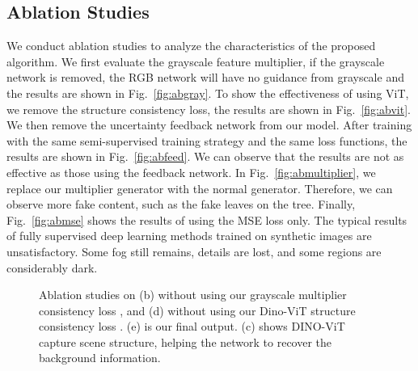 \documentclass[runningheads]{llncs}
\begin{document}
\subsection{Ablation Studies}
We conduct ablation studies to analyze the characteristics of the proposed algorithm.
We first evaluate the grayscale feature multiplier, if the grayscale network is removed, the RGB network will have no guidance from grayscale and the results are shown in Fig.~\ref{fig:abgray}.
To show the effectiveness of using ViT, we remove the structure consistency loss, the results are shown in Fig.~\ref{fig:abvit}. 
We then remove the uncertainty feedback network from our model. After training with the same semi-supervised training strategy and the same loss functions, the results are shown in Fig.~\ref{fig:abfeed}. 
We can observe that the results are not as effective as those using the feedback network. 
In Fig.~\ref{fig:abmultiplier}, we replace our multiplier generator with the normal generator. 
Therefore, we can observe more fake content, such as the fake leaves on the tree. 
Finally, Fig.~\ref{fig:abmse} shows the results of using the MSE loss only. 
The typical results of fully supervised deep learning methods trained on synthetic images are unsatisfactory. 
Some fog still remains, details are lost, and some regions are considerably dark.

\begin{figure}[t!]
	\centering
	\captionsetup[subfloat]{font=small, labelformat=empty}
	\captionsetup[subfloat]{farskip=1pt}
	\setcounter{subfigure}{0}
	\hfill
	\hfill
	\hfill
	\hfill
	\hfill
	\caption{Ablation studies on (b) without using our grayscale multiplier consistency loss , and (d) without using our Dino-ViT structure consistency loss . (e) is our final output. (c) shows DINO-ViT capture scene structure, helping the network to recover the background information.}
	\label{fig:ablation_vit}
\end{figure}
\end{document}
